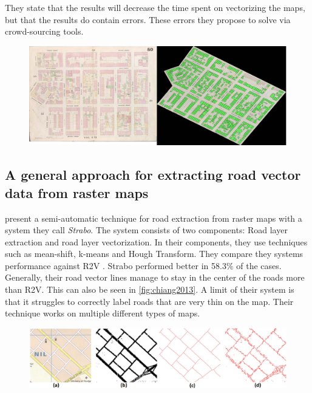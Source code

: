 They state that the results will decrease the time spent on vectorizing the maps, but that the results do contain errors. These errors they propose to solve via crowd-sourcing tools.


\begin{figure}[H]
    \centering
    \includegraphics[width=\linewidth]{fig/nyplmap.png}
    \label{fig:nyplmap}
\end{figure}

\subsection{A general approach for extracting road vector data from raster maps}

\citet{Chiang2013} present a semi-automatic technique for road extraction from raster maps with a system they call \emph{Strabo}. The system consists of two components: Road layer extraction and road layer vectorization. In their components, they use techniques such as mean-shift, k-means and Hough Transform. They compare they systems performance against R2V \cite{Wu1999}. Strabo performed better in 58.3\% of the cases. Generally, their road vector lines manage to stay in the center of the roads more than R2V. This can also be seen in \autoref{fig:chiang2013}. A limit of their system is that it struggles to correctly label roads that are very thin on the map. Their technique works on multiple different types of maps. 

\begin{figure}[H]
    \centering
    \includegraphics[width=0.9\linewidth]{fig/chiang2013.png}
    \label{fig:chiang2013}
\end{figure}

